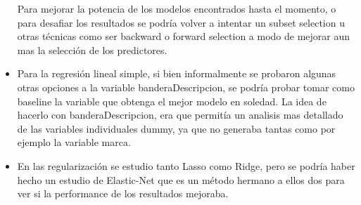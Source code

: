 \begin{itemize}
  Para mejorar la potencia de los modelos encontrados hasta el momento, o para desafiar los resultados se podría volver a intentar un subset selection u otras técnicas como ser backward o forward selection a modo de mejorar aun mas la selección de los predictores.
  \item Para la regresión lineal simple, si bien informalmente se probaron algunas otras opciones a la variable banderaDescripcion, se podría probar tomar como baseline la variable que obtenga el mejor modelo en soledad. La idea de hacerlo con banderaDescripcion, era que permitía un analisis mas detallado de las variables individuales dummy, ya que no generaba tantas como por ejemplo la variable marca.
  \item En las regularización se estudio tanto Lasso como Ridge, pero se podría haber hecho un estudio de Elastic-Net que es un método hermano a ellos dos para ver si la performance de los resultados mejoraba.

\end{itemize}